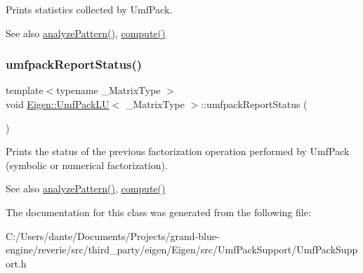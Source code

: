 Prints statistics collected by Umf\+Pack.

\begin{DoxySeeAlso}{See also}
\mbox{\hyperlink{class_eigen_1_1_umf_pack_l_u_ac7ea28b2017d6b26b7b08497f294e5e6}{analyze\+Pattern()}}, \mbox{\hyperlink{class_eigen_1_1_umf_pack_l_u_a05fb2b5717ebd67e46b83439721ceee7}{compute()}} 
\end{DoxySeeAlso}
\mbox{\label{class_eigen_1_1_umf_pack_l_u_a82497bbf75d995a6d4ae7e9191f79525}} 
\subsubsection{\texorpdfstring{umfpackReportStatus()}{umfpackReportStatus()}}
{\footnotesize\ttfamily template$<$typename \+\_\+\+Matrix\+Type $>$ \\
void \mbox{\hyperlink{class_eigen_1_1_umf_pack_l_u}{Eigen\+::\+Umf\+Pack\+LU}}$<$ \+\_\+\+Matrix\+Type $>$\+::umfpack\+Report\+Status (\begin{DoxyParamCaption}{ }\end{DoxyParamCaption})\hspace{0.3cm}{\ttfamily [inline]}}

Prints the status of the previous factorization operation performed by Umf\+Pack (symbolic or numerical factorization).

\begin{DoxySeeAlso}{See also}
\mbox{\hyperlink{class_eigen_1_1_umf_pack_l_u_ac7ea28b2017d6b26b7b08497f294e5e6}{analyze\+Pattern()}}, \mbox{\hyperlink{class_eigen_1_1_umf_pack_l_u_a05fb2b5717ebd67e46b83439721ceee7}{compute()}} 
\end{DoxySeeAlso}


The documentation for this class was generated from the following file\+:\begin{DoxyCompactItemize}
\item 
C\+:/\+Users/dante/\+Documents/\+Projects/grand-\/blue-\/engine/reverie/src/third\+\_\+party/eigen/\+Eigen/src/\+Umf\+Pack\+Support/Umf\+Pack\+Support.\+h\end{DoxyCompactItemize}
